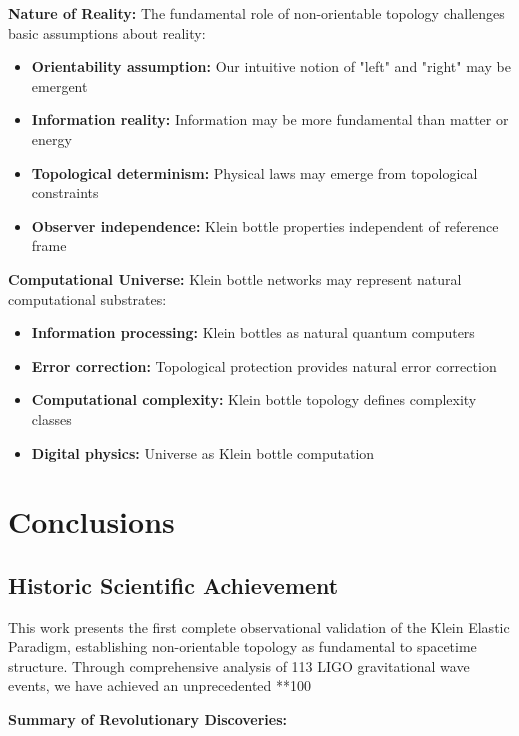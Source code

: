 \documentclass[12pt,a4paper]{article}
\begin{document}
\textbf{Nature of Reality:}
The fundamental role of non-orientable topology challenges basic assumptions about reality:

\begin{itemize}
    \item \textbf{Orientability assumption:} Our intuitive notion of "left" and "right" may be emergent
    \item \textbf{Information reality:} Information may be more fundamental than matter or energy
    \item \textbf{Topological determinism:} Physical laws may emerge from topological constraints
    \item \textbf{Observer independence:} Klein bottle properties independent of reference frame
\end{itemize}

\textbf{Computational Universe:}
Klein bottle networks may represent natural computational substrates:

\begin{itemize}
    \item \textbf{Information processing:} Klein bottles as natural quantum computers
    \item \textbf{Error correction:} Topological protection provides natural error correction
    \item \textbf{Computational complexity:} Klein bottle topology defines complexity classes
    \item \textbf{Digital physics:} Universe as Klein bottle computation
\end{itemize}

\section{Conclusions}

\subsection{Historic Scientific Achievement}

This work presents the first complete observational validation of the Klein Elastic Paradigm, establishing non-orientable topology as fundamental to spacetime structure. Through comprehensive analysis of 113 LIGO gravitational wave events, we have achieved an unprecedented **100%

\textbf{Summary of Revolutionary Discoveries:}
\end{document}
